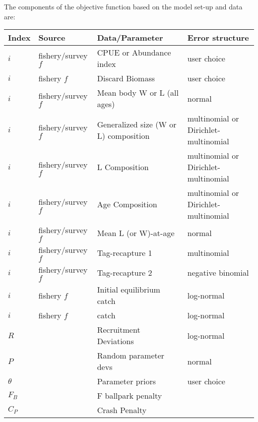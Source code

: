 The components of the objective function based on the model set-up and data are: 
\begin{longtable}{p{1cm} p{2.75cm} p{4.75cm} p{6.5cm}}
	\hline
	Index & Source & Data/Parameter & Error structure \Tstrut\Bstrut\\
	\hline	
	$i$ & fishery/survey $f$ & CPUE or Abundance index	 & user choice \Tstrut\\
	$i$ & fishery $f$		 & Discard Biomass			 & user choice \Tstrut\\
	$i$ & fishery/survey $f$ & Mean body W or L (all ages) & normal \Tstrut\\
	$i$ & fishery/survey $f$ & Generalized size (W or L) composition & multinomial or Dirichlet-multinomial \Tstrut\\
	$i$ & fishery/survey $f$ & L Composition	 		 & multinomial or Dirichlet-multinomial \Tstrut\\
	$i$ & fishery/survey $f$ & Age Composition			 & multinomial or Dirichlet-multinomial \Tstrut\\
	$i$ & fishery/survey $f$ & Mean L (or W)-at-age 	 & normal \Tstrut\\
	$i$ & fishery/survey $f$ & Tag-recapture 1			 & multinomial \Tstrut\\
	$i$ & fishery/survey $f$ & Tag-recapture 2			 & negative binomial \Tstrut\\
	$i$ & fishery $f$		 & Initial equilibrium catch & log-normal \Tstrut\\
	$i$ & fishery $f$		 & catch					 & log-normal \Tstrut\\
	$R$ & 					 & Recruitment Deviations	 & log-normal \Tstrut\\
	$P$ & 					 & Random parameter devs  	 & normal \Tstrut\\
	$\theta$ & 				 & Parameter priors			 & user choice \Tstrut\\
	$F_B$ & 				 & F ballpark penalty		 & \Tstrut\\
	$C_P$ &					 & Crash Penalty			 & \Tstrut\Bstrut\\
	\hline
\end{longtable}




\pagebreak